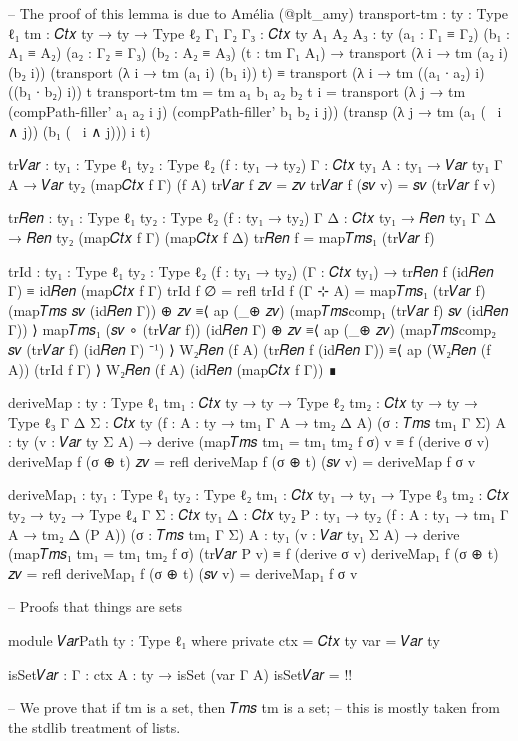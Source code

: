 \begin{code}[hide]
-- The proof of this lemma is due to Amélia (@plt_amy)
transport-tm : {ty : Type ℓ₁} {tm : 𝐶𝑡𝑥 ty → ty → Type ℓ₂} {Γ₁ Γ₂ Γ₃ : 𝐶𝑡𝑥 ty} {A₁ A₂ A₃ : ty}
  (a₁ : Γ₁ ≡ Γ₂) (b₁ : A₁ ≡ A₂) (a₂ : Γ₂ ≡ Γ₃) (b₂ : A₂ ≡ A₃) (t : tm Γ₁ A₁) →
  transport (λ i → tm (a₂ i) (b₂ i)) (transport (λ i → tm (a₁ i) (b₁ i)) t)
    ≡ transport (λ i → tm ((a₁ ∙ a₂) i) ((b₁ ∙ b₂) i)) t
transport-tm {tm = tm} a₁ b₁ a₂ b₂ t i =
  transport (λ j → tm (compPath-filler' a₁ a₂ i j) (compPath-filler' b₁ b₂ i j))
    (transp (λ j → tm (a₁ (~ i ∧ j)) (b₁ (~ i ∧ j))) i t)

tr𝑉𝑎𝑟 : {ty₁ : Type ℓ₁} {ty₂ : Type ℓ₂} (f : ty₁ → ty₂) {Γ : 𝐶𝑡𝑥 ty₁} {A : ty₁}
  → 𝑉𝑎𝑟 ty₁ Γ A → 𝑉𝑎𝑟 ty₂ (map𝐶𝑡𝑥 f Γ) (f A)
tr𝑉𝑎𝑟 f 𝑧𝑣 = 𝑧𝑣
tr𝑉𝑎𝑟 f (𝑠𝑣 v) = 𝑠𝑣 (tr𝑉𝑎𝑟 f v)

tr𝑅𝑒𝑛 : {ty₁ : Type ℓ₁} {ty₂ : Type ℓ₂} (f : ty₁ → ty₂) {Γ Δ : 𝐶𝑡𝑥 ty₁}
  → 𝑅𝑒𝑛 ty₁ Γ Δ → 𝑅𝑒𝑛 ty₂ (map𝐶𝑡𝑥 f Γ) (map𝐶𝑡𝑥 f Δ)
tr𝑅𝑒𝑛 f = map𝑇𝑚𝑠₁ (tr𝑉𝑎𝑟 f)

trId : {ty₁ : Type ℓ₁} {ty₂ : Type ℓ₂} (f : ty₁ → ty₂) (Γ : 𝐶𝑡𝑥 ty₁) →
  tr𝑅𝑒𝑛 f (id𝑅𝑒𝑛 Γ) ≡ id𝑅𝑒𝑛 (map𝐶𝑡𝑥 f Γ)
trId f ∅ = refl
trId f (Γ ⊹ A) =
  map𝑇𝑚𝑠₁ (tr𝑉𝑎𝑟 f) (map𝑇𝑚𝑠 𝑠𝑣 (id𝑅𝑒𝑛 Γ)) ⊕ 𝑧𝑣
    ≡⟨ ap (_⊕ 𝑧𝑣) (map𝑇𝑚𝑠comp₁ (tr𝑉𝑎𝑟 f) 𝑠𝑣 (id𝑅𝑒𝑛 Γ)) ⟩
  map𝑇𝑚𝑠₁ (𝑠𝑣 ∘ (tr𝑉𝑎𝑟 f)) (id𝑅𝑒𝑛 Γ) ⊕ 𝑧𝑣
    ≡⟨ ap (_⊕ 𝑧𝑣) (map𝑇𝑚𝑠comp₂ 𝑠𝑣 (tr𝑉𝑎𝑟 f) (id𝑅𝑒𝑛 Γ) ⁻¹) ⟩
  W₂𝑅𝑒𝑛 (f A) (tr𝑅𝑒𝑛 f (id𝑅𝑒𝑛 Γ))
    ≡⟨ ap (W₂𝑅𝑒𝑛 (f A)) (trId f Γ) ⟩
  W₂𝑅𝑒𝑛 (f A) (id𝑅𝑒𝑛 (map𝐶𝑡𝑥 f Γ))
    ∎

deriveMap : {ty : Type ℓ₁} {tm₁ : 𝐶𝑡𝑥 ty → ty → Type ℓ₂} {tm₂ : 𝐶𝑡𝑥 ty → ty → Type ℓ₃}
  {Γ Δ Σ : 𝐶𝑡𝑥 ty} (f : {A : ty} → tm₁ Γ A → tm₂ Δ A) (σ : 𝑇𝑚𝑠 tm₁ Γ Σ) {A : ty}
  (v : 𝑉𝑎𝑟 ty Σ A) → derive (map𝑇𝑚𝑠 {tm₁ = tm₁} {tm₂} f σ) v ≡ f (derive σ v)
deriveMap f (σ ⊕ t) 𝑧𝑣 = refl
deriveMap f (σ ⊕ t) (𝑠𝑣 v) = deriveMap f σ v

deriveMap₁ : {ty₁ : Type ℓ₁} {ty₂ : Type ℓ₂} {tm₁ : 𝐶𝑡𝑥 ty₁ → ty₁ → Type ℓ₃}
  {tm₂ : 𝐶𝑡𝑥 ty₂ → ty₂ → Type ℓ₄} {Γ Σ : 𝐶𝑡𝑥 ty₁} {Δ : 𝐶𝑡𝑥 ty₂} {P : ty₁ → ty₂}
  (f : {A : ty₁} → tm₁ Γ A → tm₂ Δ (P A)) (σ : 𝑇𝑚𝑠 tm₁ Γ Σ) {A : ty₁}
  (v : 𝑉𝑎𝑟 ty₁ Σ A) → derive (map𝑇𝑚𝑠₁ {tm₁ = tm₁} {tm₂} f σ) (tr𝑉𝑎𝑟 P v) ≡ f (derive σ v)
deriveMap₁ f (σ ⊕ t) 𝑧𝑣 = refl
deriveMap₁ f (σ ⊕ t) (𝑠𝑣 v) = deriveMap₁ f σ v

-- Proofs that things are sets

module 𝑉𝑎𝑟Path {ty : Type ℓ₁} where
  private
    ctx = 𝐶𝑡𝑥 ty
    var = 𝑉𝑎𝑟 ty

  isSet𝑉𝑎𝑟 : {Γ : ctx} {A : ty} → isSet (var Γ A)
  isSet𝑉𝑎𝑟 = {!!}

-- We prove that if tm is a set, then 𝑇𝑚𝑠 tm is a set;
-- this is mostly taken from the stdlib treatment of lists.


\end{code}
